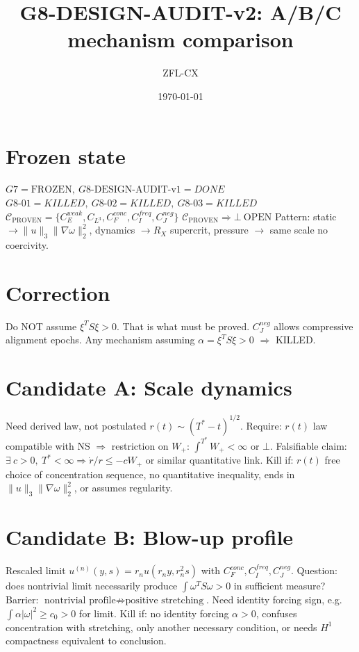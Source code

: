 \documentclass[11pt]{article}
\begin{document}
\title{G8-DESIGN-AUDIT-v2: A/B/C mechanism comparison}
\author{ZFL-CX}\date{\today}\maketitle

\section{Frozen state}
$\boxed{G7=\mathrm{FROZEN},\ G8\text{-DESIGN-AUDIT-v1}=DONE}$
$\boxed{G8\text{-}01=KILLED,\ G8\text{-}02=KILLED,\ G8\text{-}03=KILLED}$
$\boxed{\mathcal C_{\mathrm{PROVEN}}=\{C_E^{weak},C_{L^3},C_F^{conc},C_I^{freq},C_J^{neg}\}}$
$\boxed{\mathcal C_{\mathrm{PROVEN}}\Rightarrow\bot\ \mathrm{OPEN}}$
Pattern: static $\to\|u\|_3\|\nabla\omega\|_2^2$, dynamics $\to R_X$ supercrit, pressure $\to$ same scale no coercivity.

\section{Correction}
Do NOT assume $\xi^TS\xi>0$. That is what must be proved. $C_J^{neg}$ allows compressive alignment epochs. Any mechanism assuming $\alpha=\xi^TS\xi>0$ $\Rightarrow$ KILLED.

\section{Candidate A: Scale dynamics}
Need derived law, not postulated $r(t)\sim(T^*-t)^{1/2}$.
Require: $r(t)$ law compatible with NS $\Rightarrow$ restriction on $W_+$: $\int^{T^*}W_+<\infty$ or $\bot$.
Falsifiable claim: $\exists\ c>0,\ T^*<\infty\Rightarrow \dot r/r\le -cW_+$ or similar quantitative link.
Kill if: $r(t)$ free choice of concentration sequence, no quantitative inequality, ends in $\|u\|_3\|\nabla\omega\|_2^2$, or assumes regularity.

\section{Candidate B: Blow-up profile}
Rescaled limit $u^{(n)}(y,s)=r_nu(r_ny,r_n^2s)$ with $C_F^{conc},C_I^{freq},C_J^{neg}$.
Question: does nontrivial limit necessarily produce $\int\omega^TS\omega>0$ in sufficient measure?
Barrier: $\boxed{\text{nontrivial profile}\not\Rightarrow\text{positive stretching}}$.
Need identity forcing sign, e.g. $\int\alpha|\omega|^2\ge c_0>0$ for limit.
Kill if: no identity forcing $\alpha>0$, confuses concentration with stretching, only another necessary condition, or needs $H^1$ compactness equivalent to conclusion.
\end{document}
